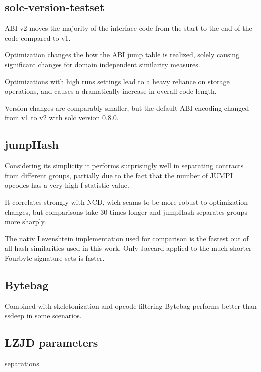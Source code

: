 \documentclass[../main.tex]{subfiles}
\begin{document}
\subsection{solc-version-testset}
ABI v2 moves the majority of the interface code from the start to the end of the code compared to v1.

Optimization changes the how the ABI jump table is realized, solely causing significant changes for domain independent similarity measures.

Optimizations with high runs settings lead to a heavy reliance on storage operations, and causes a dramatically increase in overall code length.

Version changes are comparably smaller, but the default ABI encoding changed from v1 to v2 with solc version 0.8.0.


\subsection{jumpHash}
Considering its simplicity it performs surprisingly well in separating contracts from different groups, partially due to the fact that the number of JUMPI opcodes has a very high f-statistic value.

It correlates strongly with NCD, wich seams to be more robust to optimization changes, but comparisons take 30 times longer and jumpHash separates groups more sharply.


The nativ Levenshtein implementation used for comparison is the fastest out of all hash similarities used in this work. Only Jaccard applied to the much shorter Fourbyte signature sets is faster.


\subsection{Bytebag}
Combined with skeletonization and opcode filtering Bytebag performs better than ssdeep in some scenarios.

\subsection{LZJD parameters}


\begin{table}[ht!]
  \centering

  \caption{separations}
  \label{tbl:lz_sep}
\end{table}
\end{document}
